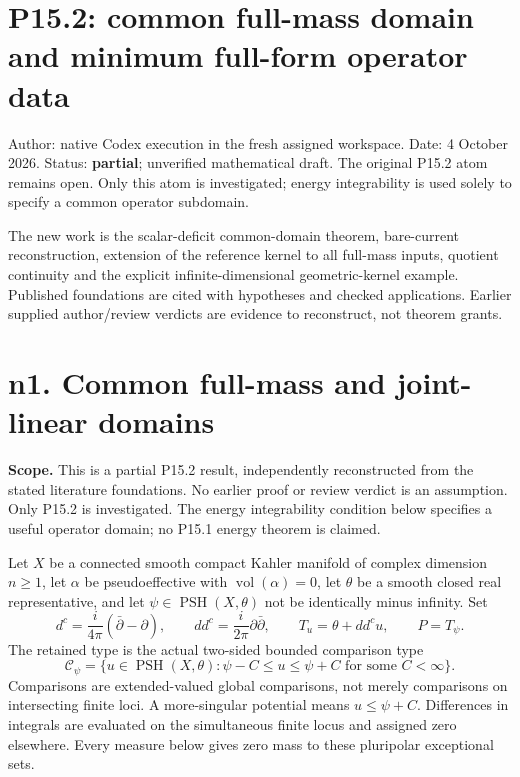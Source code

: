 \documentclass[
  11pt,
]{article}
\author{}
\date{}
\begin{document}
\section{P15.2: common full-mass domain and minimum full-form operator
data}\label{p15.2-common-full-mass-domain-and-minimum-full-form-operator-data}

Author: native Codex execution in the fresh assigned workspace. Date: 4
October 2026. Status: \textbf{partial}; unverified mathematical draft.
The original P15.2 atom remains open. Only this atom is investigated;
energy integrability is used solely to specify a common operator
subdomain.

The new work is the scalar-deficit common-domain theorem, bare-current
reconstruction, extension of the reference kernel to all full-mass
inputs, quotient continuity and the explicit infinite-dimensional
geometric-kernel example. Published foundations are cited with
hypotheses and checked applications. Earlier supplied author/review
verdicts are evidence to reconstruct, not theorem grants.

\section{n1. Common full-mass and joint-linear
domains}\label{n1.-common-full-mass-and-joint-linear-domains}

\textbf{Scope.} This is a partial P15.2 result, independently
reconstructed from the stated literature foundations. No earlier proof
or review verdict is an assumption. Only P15.2 is investigated. The
energy integrability condition below specifies a useful operator domain;
no P15.1 energy theorem is claimed.

Let \(X\) be a connected smooth compact Kahler manifold of complex
dimension \(n\geq1\), let \(\alpha\) be pseudoeffective with
\(\operatorname{vol}(\alpha)=0\), let \(\theta\) be a smooth closed real
representative, and let \(\psi\in\operatorname{PSH}(X,\theta)\) not be
identically minus infinity. Set \[
d^c=\frac{i}{4\pi}(\bar\partial-\partial),\qquad dd^c=\frac{i}{2\pi}\partial\bar\partial,
\qquad T_u=\theta+dd^cu,\qquad P=T_\psi.
\] The retained type is the actual two-sided bounded comparison type \[
\mathcal C_\psi=\{u\in\operatorname{PSH}(X,\theta):\psi-C\leq u\leq\psi+C\text{ for some }C<\infty\}.
\] Comparisons are extended-valued global comparisons, not merely
comparisons on intersecting finite loci. A more-singular potential means
\(u\leq\psi+C\). Differences in integrals are evaluated on the
simultaneous finite locus and assigned zero elsewhere. Every measure
below gives zero mass to these pluripolar exceptional sets.
\end{document}
